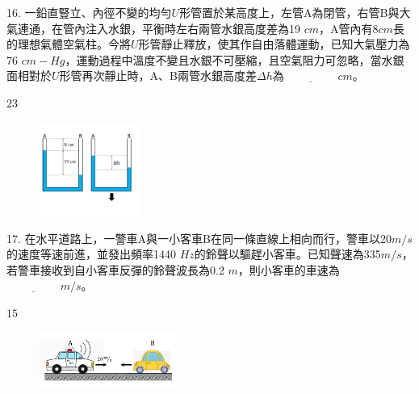 \documentclass[cn,10pt,math=newtx,chinesefont=founder,device=ig]{elegantbook}
\begin{document}
\begin{example}
   16. 一鉛直豎立、內徑不變的均勻$U$形管置於某高度上，左管A為閉管，右管B與大氣連通，在管內注入水銀，平衡時左右兩管水銀高度差為19 $cm$，A管內有8$cm$長的理想氣體空氣柱。今將$U$形管靜止釋放，使其作自由落體運動，已知大氣壓力為76 $cm-Hg$，運動過程中溫度不變且水銀不可壓縮，且空氣阻力可忽略，當水銀面相對於$U$形管再次靜止時，A、B兩管水銀高度差$\Delta h$為$\underline{\hspace{2cm}} cm$。\\
    \rightline{[桃園高中教甄109]}
\end{example}
\begin{solution}
    $23$
\end{solution}
\begin{figure}[htbp]
    \flushright
    \includegraphics[width=0.3\textwidth]{image/109桃園16.png}
  \end{figure}
\newpage

\begin{example}
   17. 在水平道路上，一警車A與一小客車B在同一條直線上相向而行，警車以20$m/s$的速度等速前進，並發出頻率1440 $Hz$的鈴聲以驅趕小客車。已知聲速為335$m/s$，若警車接收到自小客車反彈的鈴聲波長為0.2 $m$，則小客車的車速為$\underline{\hspace{2cm}} m/s$。\\
    \rightline{[桃園高中教甄109]}
\end{example}
\begin{solution}
    $15$
\end{solution}
\begin{figure}[htbp]
    \flushright
    \includegraphics[width=0.4\textwidth]{image/109桃園17.png}
  \end{figure}
\newpage
\end{document}
